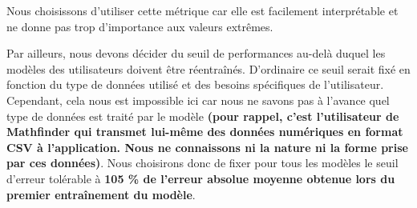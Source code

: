 \documentclass[french]{article}
\begin{document}
    Nous choisissons d'utiliser cette métrique car elle est facilement interprétable et ne donne pas trop d'importance aux valeurs extrêmes.

    Par ailleurs, nous devons décider du seuil de performances au-delà duquel les modèles des utilisateurs doivent être réentraînés. D'ordinaire ce seuil serait fixé en fonction du type de données utilisé et des besoins spécifiques de l'utilisateur. Cependant, cela nous est impossible ici car nous ne savons pas à l'avance quel type de données est traité par le modèle \textbf{(pour rappel, c'est l'utilisateur de Mathfinder qui transmet lui-même des données numériques en format CSV à l'application. Nous ne connaissons ni la nature ni la forme prise par ces données)}. Nous choisirons donc de fixer pour tous les modèles le seuil d'erreur tolérable à \textbf{105 \% de l'erreur absolue moyenne obtenue lors du premier entraînement du modèle}.
\end{document}
